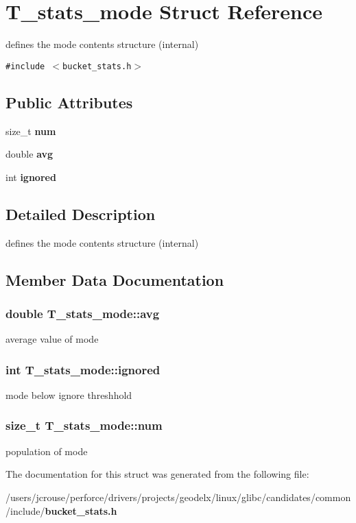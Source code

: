 \section{T\_\-stats\_\-mode Struct Reference}
\label{structT__stats__mode}
defines the mode contents structure (internal) 


{\tt \#include $<$bucket\_\-stats.h$>$}

\subsection*{Public Attributes}
\begin{CompactItemize}
\item 
size\_\-t {\bf num}
\item 
double {\bf avg}
\item 
int {\bf ignored}
\end{CompactItemize}


\subsection{Detailed Description}
defines the mode contents structure (internal)



\subsection{Member Data Documentation}
\subsubsection{\setlength{\rightskip}{0pt plus 5cm}double T\_\-stats\_\-mode::avg}\label{structT__stats__mode_m1}


average value of mode 
\subsubsection{\setlength{\rightskip}{0pt plus 5cm}int T\_\-stats\_\-mode::ignored}\label{structT__stats__mode_m2}


mode below ignore threshhold 
\subsubsection{\setlength{\rightskip}{0pt plus 5cm}size\_\-t T\_\-stats\_\-mode::num}\label{structT__stats__mode_m0}


population of mode 

The documentation for this struct was generated from the following file:\begin{CompactItemize}
\item 
/users/jcrouse/perforce/drivers/projects/geodelx/linux/glibc/candidates/common/include/{\bf bucket\_\-stats.h}\end{CompactItemize}

